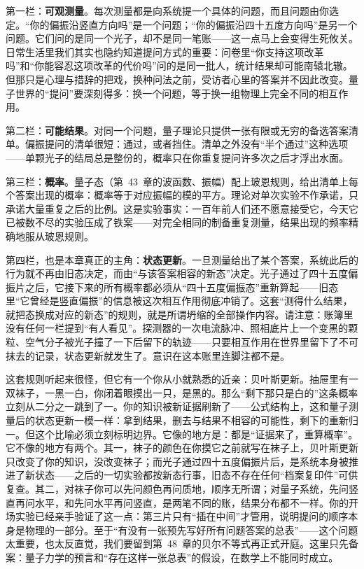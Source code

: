 第一栏：\textbf{可观测量}。每次测量都是向系统提一个具体的问题，而且问题由你选定。“你的偏振沿竖直方向吗”是一个问题；“你的偏振沿四十五度方向吗”是另一个问题。它们问的是同一个光子，却不是同一笔账——这一点马上会变得生死攸关。日常生活里我们其实也隐约知道提问方式的重要：问卷里“你支持这项改革吗”和“你能容忍这项改革的代价吗”问的是同一批人，统计结果却可能南辕北辙。但那只是心理与措辞的把戏，换种问法之前，受访者心里的答案并不因此改变。量子世界的“提问”要深刻得多：换一个问题，等于换一组物理上完全不同的相互作用。

第二栏：\textbf{可能结果}。对同一个问题，量子理论只提供一张有限或无穷的备选答案清单。偏振提问的清单很短：通过，或者挡住。清单之外没有“半个通过”这种选项——单颗光子的结局总是整份的，概率只在你重复提问许多次之后才浮出水面。

第三栏：\textbf{概率}。量子态（第~43~章的波函数、振幅）配上玻恩规则，给出清单上每个答案出现的概率：概率等于对应振幅的模的平方。理论对单次实验不作承诺，只承诺大量重复之后的比例。这是实验事实：一百年前人们还不愿意接受它，今天它已被数不尽的实验压成了铁案——对完全相同的制备重复测量，结果出现的频率精确地服从玻恩规则。

第四栏，也是本章真正的主角：\textbf{状态更新}。一旦测量给出了某个答案，系统此后的行为就不再由旧态决定，而由“与该答案相容的新态”决定。光子通过了四十五度偏振片之后，它接下来的所有概率都必须从“四十五度偏振态”重新算起——旧态里“它曾经是竖直偏振”的信息被这次相互作用彻底冲销了。这套“测得什么结果，就把态换成对应的新态”的规则，就是所谓坍缩的全部操作内容。请注意：账簿里没有任何一栏提到“有人看见”。探测器的一次电流脉冲、照相底片上一个变黑的颗粒、空气分子被光子撞了一下后留下的轨迹——只要相互作用在世界里留下了不可抹去的记录，状态更新就发生了。意识在这本账里连脚注都不是。

这套规则听起来很怪，但它有一个你从小就熟悉的近亲：贝叶斯更新。抽屉里有一双袜子，一黑一白，你闭着眼摸出一只，是黑的。那么“剩下那只是白的”这条概率立刻从二分之一跳到了一。你的知识被新证据刷新了——公式结构上，这和量子测量后的状态更新一模一样：拿到结果，删去与结果不相容的可能性，剩下的重新归一。但这个比喻必须立刻标明边界。它像的地方是：都是“证据来了，重算概率”。它不像的地方有两个。其一，袜子的颜色在你摸它之前就写在袜子上，贝叶斯更新只改变了你的知识，没改变袜子；而光子通过四十五度偏振片后，是系统本身被推进了新状态——之后的一切实验都按新态行事，旧态不存在任何“档案复印件”可供复查。其二，对袜子你可以先问颜色再问质地，顺序无所谓；对量子系统，先问竖直再问水平，和先问水平再问竖直，是两笔不同的账，结果分布都不一样。你的开场实验已经亲手验证了这一点：第三片只有“插在中间”才管用，说明提问的顺序本身是物理的一部分。至于“有没有一张预先写好所有问题答案的总表”——这个问题太重要，也太反直觉，我们要留到第~48~章的贝尔不等式再正式开庭。这里只先备案：量子力学的预言和“存在这样一张总表”的假设，在数学上不能同时成立。

